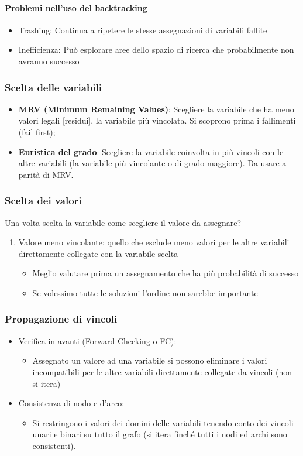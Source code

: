 \documentclass[../main.tex]{subfiles}
\begin{document}
	\paragraph{Problemi nell’uso del backtracking}
	\begin{itemize}
		\item Trashing: Continua a ripetere le stesse assegnazioni di variabili fallite
		\item Inefficienza: Può esplorare aree dello spazio di ricerca che probabilmente non avranno successo
	\end{itemize}
	\subsubsection{Scelta delle variabili}
	\begin{itemize}
		\item \textbf{MRV (Minimum Remaining Values)}: Scegliere la variabile che ha meno valori legali [residui], la variabile più vincolata. Si scoprono prima i fallimenti (fail first);
		\item \textbf{Euristica del grado}: Scegliere la variabile coinvolta in più vincoli con le altre variabili (la variabile più vincolante o di grado maggiore). Da usare a parità di MRV.
	\end{itemize}
	\subsubsection{Scelta dei valori}
	Una volta scelta la variabile come scegliere il valore da assegnare?
	\begin{enumerate}
		\item Valore meno vincolante: quello che esclude meno valori per le altre variabili direttamente collegate con la variabile scelta
		\begin{itemize}
			\item Meglio valutare prima un assegnamento che ha più probabilità di successo
			\item Se volessimo tutte le soluzioni l’ordine non sarebbe importante
		\end{itemize}
	\end{enumerate}
	\subsubsection{Propagazione di vincoli}
	\begin{itemize}
		\item Verifica in avanti (Forward Checking o FC):
		\begin{itemize}
			\item Assegnato un valore ad una variabile si possono eliminare i valori incompatibili per le altre variabili direttamente collegate da vincoli (non si itera)
		\end{itemize}
		\item Consistenza di nodo e d’arco:
		\begin{itemize}
			\item Si restringono i valori dei domini delle variabili tenendo conto dei vincoli unari e binari su tutto il grafo (si itera finché tutti i nodi ed archi sono consistenti).
		\end{itemize}
	\end{itemize}
\end{document}
